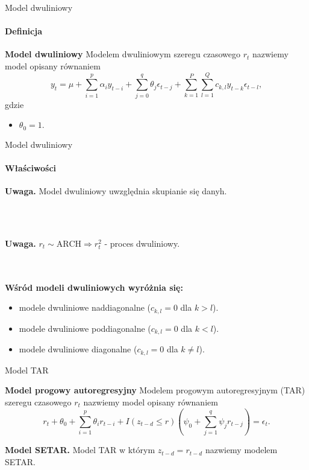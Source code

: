 \documentclass[a4paper, 11pt]{beamer}
\begin{document}
	\begin{frame}{Model dwuliniowy}
		\framesubtitle{Definicja}
		\begin{block}{\textbf{Model dwuliniowy}}
			Modelem dwuliniowym szeregu czasowego $r_t$ nazwiemy model
			opisany równaniem \[
				y_t = \mu + 
					\sum_{i=1}^{p} \alpha_i y_{t-i} + 
					\sum_{j=0}^{q} \theta_j \epsilon_{t-j} + 
					\sum_{k=1}^{P} \sum_{l=1}^{Q} c_{k,l} y_{t-k} \epsilon_{t-l},
			\] gdzie
			\begin{itemize}
				\item $\theta_0 = 1.$
			\end{itemize}
		\end{block}
	\end{frame}
	
	\begin{frame}{Model dwuliniowy}
		\framesubtitle{Właściwości}
		\begin{alert}{\textbf{Uwaga.}}
			Model dwuliniowy uwzględnia skupianie się danyh.
		\end{alert}
		\\~\\
		\begin{alert}{\textbf{Uwaga.}}
			$r_t \sim \mbox{ARCH} \Rightarrow r_t^2$ - proces dwuliniowy.
		\end{alert}
		\\~\\
		\textbf{Wśród modeli dwuliniowych wyróżnia się:}
		\begin{itemize}
			\item modele dwuliniowe naddiagonalne ($c_{k,l} = 0$ dla $k > l$).
			\item modele dwuliniowe poddiagonalne ($c_{k,l} = 0$ dla $k < l$).
			\item modele dwuliniowe diagonalne ($c_{k,l} = 0$ dla $k \neq l$).
		\end{itemize}
	\end{frame}
	
	\begin{frame}{Model TAR}
		\begin{block}{\textbf{Model progowy autoregresyjny}}
			Modelem progowym autoregresyjnym (TAR) szeregu czasowego $r_t$ nazwiemy model opisany równaniem \[
				r_t + \theta_0 + \sum_{i=1}^p \theta_i r_{t-i} + 
					I\left(z_{t-d} \leq r\right) \left(\psi_0 + \sum_{j=1}^{q} \psi_j r_{t-j}\right) = \epsilon_t.
			\]
		\end{block}
		
		\begin{alert}{\textbf{Model SETAR.}}
			Model TAR w którym $z_{t-d} = r_{t-d}$ nazwiemy modelem SETAR.
		\end{alert}
	\end{frame}
	
\end{document}
